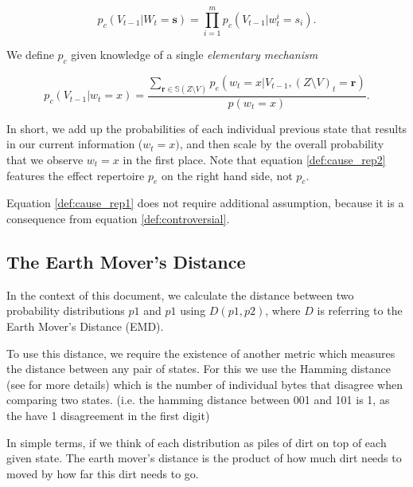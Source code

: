 \begin{equation}
\label{def:cause_rep1}
p_c(V_{t-1} | W_t=\mathbf{s}) = \prod \limits_{i = 1}^{m} p_c(V_{t-1}|w^i_{t} = s_i).
\end{equation}

We define $p_c$ given knowledge of a single \textit{elementary mechanism}

\begin{equation}
\label{def:cause_rep2}
p_c(V_{t-1}| w_t = x) = \frac{\sum \limits_{\mathbf{r} \in \mathbb{S}(Z\setminus V)} p_e(w_t = x| V_{t-1}, (Z \setminus V)_t = \mathbf{r})}{p(w_t = x)}.
\end{equation}

In short, we add up the probabilities of each individual previous state that results in our current information ($w_t = x)$, and then scale by the overall probability that we observe $w_t = x$ in the first place. Note that equation \ref{def:cause_rep2} features the effect repertoire $p_e$ on the right hand side, not $p_c$.

\begin{remark}
	Equation \ref{def:cause_rep1} does not require additional assumption, because it is a consequence from equation \ref{def:controversial}.
\end{remark}



\subsection{The Earth Mover's Distance }
In the context of this document, we calculate the distance between two probability distributions $p1$ and $p1$ using $D(p1,p2)$, where $D$ is referring to the Earth Mover's Distance (EMD).

To use this distance, we require the existence of another metric which measures the distance between any pair of states. For this we use the Hamming distance (see \cite{hill1986first} for more details) which is the number of individual bytes that disagree when comparing two states. (i.e. the hamming distance between 001 and 101 is 1, as the have 1 disagreement in the first digit)

In simple terms, if we think of each distribution as piles of dirt on top of each given state. The earth mover's distance is the product of how much dirt needs to moved by how far this dirt needs to go. 

